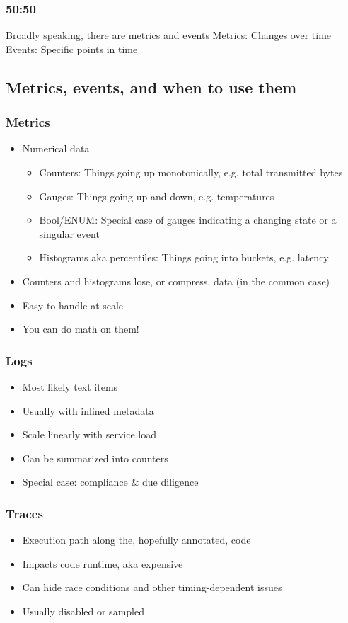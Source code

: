 \documentclass[t]{beamer}
\begin{document}
\begin{frame}
	\frametitle{50:50}
	\begin{center}
		\vfill
		Broadly speaking, there are metrics and events
		\vfill
		Metrics: Changes over time
		\vfill
		Events: Specific points in time
		\vfill
	\end{center}
\end{frame}


\subsection{Metrics, events, and when to use them}

\begin{frame}
	\frametitle{Metrics}
	\begin{itemize}
		\item Numerical data
		\begin{itemize}
			\item Counters: Things going up monotonically, e.g. total transmitted bytes
			\item Gauges: Things going up and down, e.g. temperatures
			\item Bool/ENUM: Special case of gauges indicating a changing state or a singular event
			\item Histograms aka percentiles: Things going into buckets, e.g. latency
		\end{itemize}
		\item Counters and histograms lose, or compress, data (in the common case)
		\item Easy to handle at scale
		\item You can do math on them!
	\end{itemize}
\end{frame}


\begin{frame}
	\frametitle{Logs}
	\begin{itemize}
		\item Most likely text items
		\item Usually with inlined metadata
		\item Scale linearly with service load
		\item Can be summarized into counters
		\item Special case: compliance \& due diligence
	\end{itemize}
\end{frame}

\begin{frame}
	\frametitle{Traces}
	\begin{itemize}
		\item Execution path along the, hopefully annotated, code
		\item Impacts code runtime, aka expensive
		\item Can hide race conditions and other timing-dependent issues
		\item Usually disabled or sampled
	\end{itemize}
\end{frame}
\end{document}
